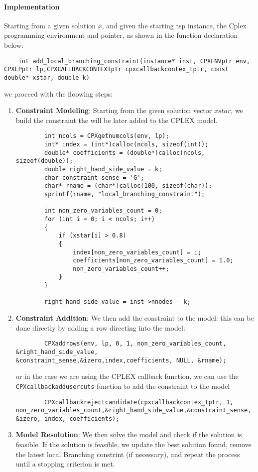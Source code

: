 \documentclass{article}
\begin{document}
\paragraph{Implementation}
Starting from a given solution $\bar{x}$, and given the starting tsp instance, the Cplex programming environment and pointer, as shown in the function declaration below:
\begin{lstlisting}
	int add_local_branching_constraint(instance* inst, CPXENVptr env, CPXLPptr lp,CPXCALLBACKCONTEXTptr cpxcallbackcontex_tptr, const double* xstar, double k)
\end{lstlisting} 
we proceed with the floowing steps:
\begin{enumerate}
	\item \textbf{Constraint Modeling}: Starting from the given solution vector $xstar$, we build the constraint the will be later added to the CPLEX model.
	\begin{lstlisting}
		int ncols = CPXgetnumcols(env, lp);
		int* index = (int*)calloc(ncols, sizeof(int));
		double* coefficients = (double*)calloc(ncols, sizeof(double));
		double right_hand_side_value = k;
		char constraint_sense = 'G';
		char* rname = (char*)calloc(100, sizeof(char));
		sprintf(rname, "local_branching_constraint");

		int non_zero_variables_count = 0;
		for (int i = 0; i < ncols; i++)
		{
			if (xstar[i] > 0.8)
			{
				index[non_zero_variables_count] = i;
				coefficients[non_zero_variables_count] = 1.0;
				non_zero_variables_count++;
			}
		}

		right_hand_side_value = inst->nnodes - k;
	\end{lstlisting}
	\item \textbf{Constraint Addition}: We then add the constraint to the model: this can be done directly by adding a row directing into the model:
	\begin{lstlisting}
		CPXaddrows(env, lp, 0, 1, non_zero_variables_count, &right_hand_side_value, &constraint_sense,&izero,index,coefficients, NULL, &rname);
	\end{lstlisting}
	or in the case we are using the CPLEX callback function, we can use the \texttt{CPXcallbackaddusercuts} function to add the constraint to the model
	\begin{lstlisting}
		CPXcallbackrejectcandidate(cpxcallbackcontex_tptr, 1, non_zero_variables_count,&right_hand_side_value,&constraint_sense, &izero, index, coefficients);
	\end{lstlisting}
	\item \textbf{Model Resolution}: We then solve the model and check if the solution is feasible. If the solution is feasible, we update the best solution found, 
	remove the latest local Branching constrint (if necessary), and repeat the process until a stopping criterion is met.
\end{enumerate}
\end{document}
